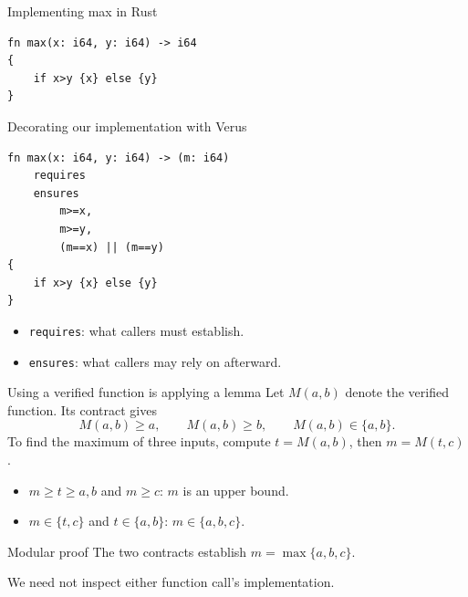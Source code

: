 \begin{frame}[fragile]{Implementing max in Rust}
\begin{lstlisting}
fn max(x: i64, y: i64) -> i64
{
    if x>y {x} else {y}
}
\end{lstlisting}
\end{frame}
\begin{frame}[fragile]{Decorating our implementation with Verus}
\begin{lstlisting}
fn max(x: i64, y: i64) -> (m: i64)
    requires
    ensures
        m>=x,
        m>=y,
        (m==x) || (m==y)
{
    if x>y {x} else {y}
}
\end{lstlisting}
\begin{itemize}
\item \texttt{requires}: what callers must establish.
\item \texttt{ensures}: what callers may rely on afterward.
\end{itemize}
\end{frame}

\begin{frame}{Using a verified function is applying a lemma}
Let $M(a,b)$ denote the verified function. Its contract gives
\[
 M(a,b)\ge a,\qquad M(a,b)\ge b,\qquad M(a,b)\in\{a,b\}.
\]
To find the maximum of three inputs, compute $t=M(a,b)$, then $m=M(t,c)$.
\begin{itemize}
\item $m\ge t\ge a,b$ and $m\ge c$: $m$ is an upper bound.
\item $m\in\{t,c\}$ and $t\in\{a,b\}$: $m\in\{a,b,c\}$.
\end{itemize}
\begin{block}{Modular proof}
The two contracts establish $m=\max\{a,b,c\}$.\par
We need not inspect either function call's implementation.
\end{block}
\end{frame}

